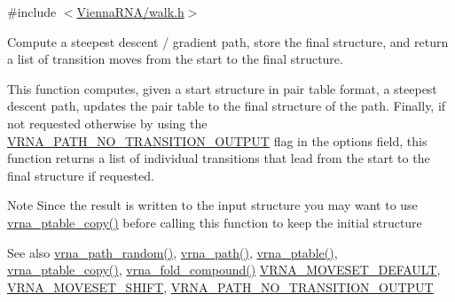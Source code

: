 {\ttfamily \#include $<$\mbox{\hyperlink{walk_8h}{Vienna\+R\+N\+A/walk.\+h}}$>$}



Compute a steepest descent / gradient path, store the final structure, and return a list of transition moves from the start to the final structure. 

This function computes, given a start structure in pair table format, a steepest descent path, updates the pair table to the final structure of the path. Finally, if not requested otherwise by using the \mbox{\hyperlink{group__paths_ga1ee63e54ecf136491e12ff03ede2622d}{V\+R\+N\+A\+\_\+\+P\+A\+T\+H\+\_\+\+N\+O\+\_\+\+T\+R\+A\+N\+S\+I\+T\+I\+O\+N\+\_\+\+O\+U\+T\+P\+UT}} flag in the {\ttfamily options} field, this function returns a list of individual transitions that lead from the start to the final structure if requested.

\begin{DoxyNote}{Note}
Since the result is written to the input structure you may want to use \mbox{\hyperlink{group__struct__utils_ga2daefbbd6d9f8803731651882f54332d}{vrna\+\_\+ptable\+\_\+copy()}} before calling this function to keep the initial structure
\end{DoxyNote}
\begin{DoxySeeAlso}{See also}
\mbox{\hyperlink{group__paths_ga9234756c337078fa599529d3db70d913}{vrna\+\_\+path\+\_\+random()}}, \mbox{\hyperlink{group__paths_gab6aee4143f8b103518d5cbfe6bfe5eae}{vrna\+\_\+path()}}, \mbox{\hyperlink{group__struct__utils_gae829fb8bb7f694c12a9c0bbc34c77c60}{vrna\+\_\+ptable()}}, \mbox{\hyperlink{group__struct__utils_ga2daefbbd6d9f8803731651882f54332d}{vrna\+\_\+ptable\+\_\+copy()}}, \mbox{\hyperlink{group__fold__compound_ga6601d994ba32b11511b36f68b08403be}{vrna\+\_\+fold\+\_\+compound()}} \mbox{\hyperlink{group__neighbors_gaa5ffec4dd0d02df320f123e6888154d1}{V\+R\+N\+A\+\_\+\+M\+O\+V\+E\+S\+E\+T\+\_\+\+D\+E\+F\+A\+U\+LT}}, \mbox{\hyperlink{group__neighbors_ga68ea27c81de4b74e48b775c04052590b}{V\+R\+N\+A\+\_\+\+M\+O\+V\+E\+S\+E\+T\+\_\+\+S\+H\+I\+FT}}, \mbox{\hyperlink{group__paths_ga1ee63e54ecf136491e12ff03ede2622d}{V\+R\+N\+A\+\_\+\+P\+A\+T\+H\+\_\+\+N\+O\+\_\+\+T\+R\+A\+N\+S\+I\+T\+I\+O\+N\+\_\+\+O\+U\+T\+P\+UT}}
\end{DoxySeeAlso}

